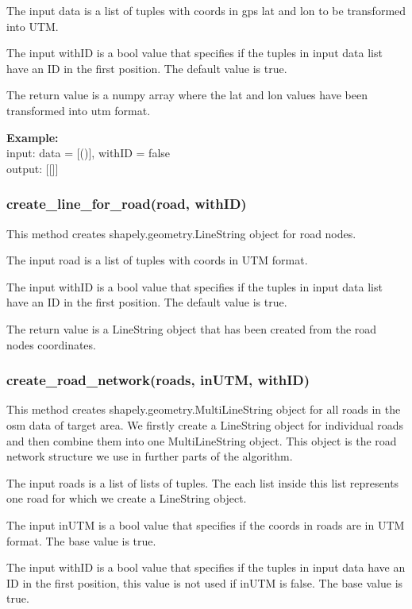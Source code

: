 \documentclass[oneside]{article}
\begin{document}
            The input data is a list of tuples with coords in gps lat and lon to be transformed into UTM.

            The input withID is a bool value that specifies if the tuples in input data list have an ID in the first position. The default value is true.

            The return value is a numpy array where the lat and lon values have been transformed into utm format.

            \textbf{Example:}\\
            \noindent input: data = [()], withID = false\\
            \noindent output: [[]]

            \subsubsection{create\_line\_for\_road(road, withID)}
            This method creates shapely.geometry.LineString object for road nodes.

            The input road is a list of tuples with coords in UTM format.

            The input withID is a bool value that specifies if the tuples in input data list have an ID in the first position. The default value is true.

            The return value is a LineString object that has been created from the road nodes coordinates.

            \subsubsection{create\_road\_network(roads, inUTM, withID)}
            This method creates shapely.geometry.MultiLineString object for all roads in the osm data of target area. We firstly create a LineString object for individual roads and then combine them into one MultiLineString object. This object is the road network structure we use in further parts of the algorithm.

            The input roads is a list of lists of tuples. The each list inside this list represents one road for which we create a LineString object.

            The input inUTM is a bool value that specifies if the coords in roads are in UTM format. The base value is true.

            The input withID is a bool value that specifies if the tuples in input data have an ID in the first position, this value is not used if inUTM is false. The base value is true.
\end{document}
